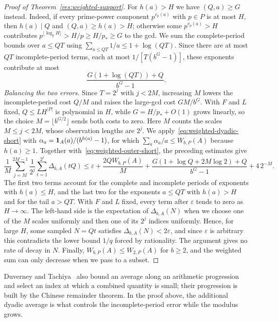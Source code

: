 \documentclass[11pt]{article}
\begin{document}
\begin{proof}[Proof of Theorem~\ref{res:weighted-support}]
For $h(a)>H$ we have $(Q,a)\ge G$ instead. Indeed, if every
prime-power component $p^{v_p(a)}$ with $p\in P$ is at most $H$, then
$h(a)\mid Q$ and $(Q,a)\ge h(a)>H$; otherwise some $p^{v_p(a)}>H$
contributes $p^{\lfloor\log_pH\rfloor}>H/p\ge H/p_*\ge G$ to the gcd.
We sum the complete-period bounds over $a\le QT$ using
$\sum_{a\le QT}1/a\le1+\log(QT)$. Since there are at most $QT$
incomplete-period terms, each at most $1/[T(b^G-1)]$, these exponents
contribute at most
\[
 \frac{G(1+\log(QT))+Q}{b^G-1}.
\]
\emph{Balancing the two errors.}
Since $T=2^j$ with $j<2M$, increasing $M$ lowers the
incomplete-period cost $Q/M$ and raises the large-gcd cost $GM/b^G$.
With $F$ and $L$ fixed, $Q\le LH^{|P|}$ is polynomial in $H$, while
$G=H/p_*+O(1)$ grows linearly, so the choice
$M=\lfloor b^{G/2}\rfloor$ sends both costs to zero. Here $M$ counts
the scales $M\le j<2M$, whose observation lengths are $2^j$.
We apply~\eqref{eq:weighted-dyadic-short} with
$\alpha_a={\bf1}_A(a)/(b^{h(a)}-1)$, for which
$\sum_a\alpha_a/a\le W_{b,P}(A)$ because $h(a)\ge1$.
Together with~\eqref{eq:weighted-outer-short}, the preceding estimates give
\begin{equation}\label{eq:weighted-main-bound}
 \frac1M\sum_{j=M}^{2M-1}\frac1{2^j}
 \sum_{t=1}^{2^j}\Delta_{b,A}(tQ)
 \le \varepsilon+\frac{2QW_{b,P}(A)}M
 +\frac{G(1+\log Q+2M\log2)+Q}{b^G-1}+4\,2^{-M}.
\end{equation}
The first two terms account for the complete and incomplete periods of
exponents with $h(a)\le H$, and the last two for the exponents
$a\le QT$ with $h(a)>H$ and for the tail $a>QT$. With $F$ and $L$
fixed, every term after $\varepsilon$ tends to zero as $H\to\infty$.
The left-hand side is the expectation of $\Delta_{b,A}(N)$ when we
choose one of the $M$ scales uniformly and then one of its $2^j$
indices uniformly. Hence, for large $H$, some sampled $N=Qt$ satisfies
$\Delta_{b,A}(N)<2\varepsilon$, and since $\varepsilon$ is arbitrary
this contradicts the lower bound $1/q$ forced by rationality. The
argument gives no rate of decay in $N$. Finally,
$W_{b,P}(A)\le W_{2,P}(A)$ for $b\ge2$, and the weighted sum can only
decrease when we pass to a subset.
\end{proof}

Duverney and Tachiya~\cite[Section~2, (2.3)--(2.9)]{duverneytachiya}
also bound an average along an arithmetic progression and select an
index at which a combined quantity is small; their progression is built
by the Chinese remainder theorem. In the proof above, the additional
dyadic average is what controls the incomplete-period error while the
modulus grows.
\end{document}
